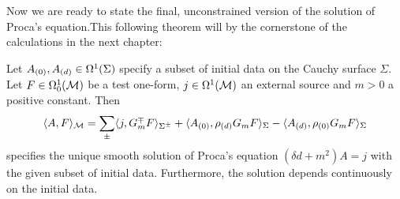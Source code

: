 %
%
%
%
Now we are ready to state the final, unconstrained version of the solution of Proca's equation.This following theorem will by the cornerstone of the calculations in the next chapter:
%
%
%
\begin{theorem}\label{thm:solution_proca_unconstrained}
 Let ${A_{(0)}},{A_{(d)}} \in \Omega^1(\Sigma)$ specify a subset of initial data on the Cauchy surface $\Sigma$. Let $F \in \Omega^1_0(\mathcal{M})$ be a test one-form, $j \in \Omega^1(\mathcal{M})$ an external source and $m >0$ a positive constant.
 Then
 \begin{align}
  \langle A, F \rangle_{\mathcal{M}} = \sum\limits_\pm \langle j , G_m^\mp F   \rangle_{\Sigma^\pm}
  + \langle {A_{(0)}} , \rho_{(d)} G_m F \rangle_\Sigma
 - \langle {A_{(d)}} , \rho_{(0)} G_m F \rangle_\Sigma \label{eqn:solution_proca_unconstrained}
 \end{align}
specifies the unique smooth solution of Proca's equation $\left( \delta d + m^2 \right) A = j$ with the given subset of initial data. Furthermore,  the solution depends continuously on the initial data.
\end{theorem}
%
%
%
